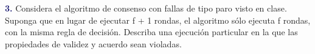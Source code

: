 \newpage
\textbf{\textcolor{MidnightBlue}{3.}} Considera el algoritmo de consenso con fallas de tipo paro visto en clase. Suponga que en lugar de ejecutar f + 1 rondas, el algoritmo sólo ejecuta f rondas, con la misma regla de decisión. Describa una ejecución particular en la que las propiedades de validez y acuerdo sean violadas.